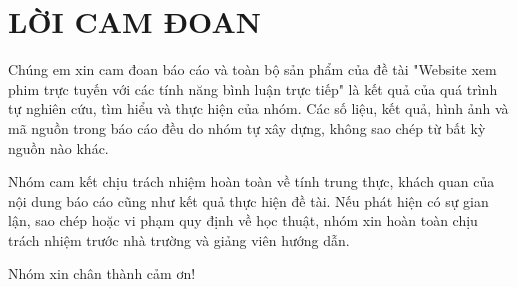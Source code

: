 
\newpage

\section*{LỜI CAM ĐOAN}

Chúng em xin cam đoan báo cáo và toàn bộ sản phẩm của đề tài "Website xem phim trực tuyến với các tính năng bình luận trực tiếp" là kết quả của quá trình tự nghiên cứu, tìm hiểu và thực hiện của nhóm. Các số liệu, kết quả, hình ảnh và mã nguồn trong báo cáo đều do nhóm tự xây dựng, không sao chép từ bất kỳ nguồn nào khác.

Nhóm cam kết chịu trách nhiệm hoàn toàn về tính trung thực, khách quan của nội dung báo cáo cũng như kết quả thực hiện đề tài. Nếu phát hiện có sự gian lận, sao chép hoặc vi phạm quy định về học thuật, nhóm xin hoàn toàn chịu trách nhiệm trước nhà trường và giảng viên hướng dẫn.

Nhóm xin chân thành cảm ơn!
